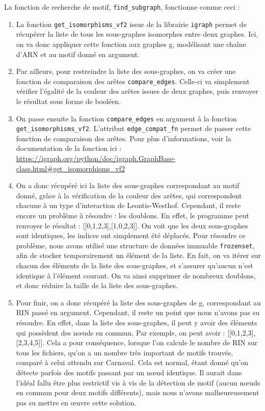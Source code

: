 \documentclass[11pt,a4paper]{article}
\begin{document}
La fonction de recherche de motif, \texttt{find\_subgraph}, fonctionne comme ceci : \\
\begin{enumerate}
\item La fonction \texttt{get\_isomorphisms\_vf2} issue de la librairie \texttt{igraph} permet de récupérer la liste de tous les sous-graphes isomorphes entre deux graphes. Ici, on va donc appliquer cette fonction aux graphes g, modélisant une chaîne d'ARN et au motif donné en argument. \\
\item Par ailleurs, pour restreindre la liste des sous-graphes, on va créer une fonction de comparaison des arêtes \texttt{compare\_edges}. Celle-ci va simplement vérifier l'égalité de la couleur des arêtes issues de deux graphes, puis renvoyer le résultat sous forme de booléen.  \\
\item On passe ensuite la fonction \texttt{compare\_edges} en argument à la fonction \texttt{get\_isomorphisms\_vf2}. L'attribut \texttt{edge\_compat\_fn} permet de passer cette fonction de comparaison des arêtes. Pour plus d'informations, voir la documentation de la fonction ici : 
\url{https://igraph.org/python/doc/igraph.GraphBase-class.html#get_isomorphisms_vf2} \\
\item On a donc récupéré ici la liste des sous-graphes correspondant au motif donné, grâce à la vérification de la couleur des arêtes, qui correspondent chacune à un type d'interaction de Leontis-Westhof.
Cependant, il reste encore un problème à résoudre : les doublons. En effet, le programme peut renvoyer le résultat : [[0,1,2,3],[1,0,2,3]].
On voit que les deux sous-graphes sont identiques, les indices ont simplement été déplacés. Pour résoudre ce problème, nous avons utilisé une structure de données immuable \texttt{frozenset}, afin de stocker temporairement un élément de la liste. En fait, on va itérer sur chacun des éléments de la liste des sous-graphes, et s'assurer qu'aucun n'est identique à l'élément courant. On va ainsi supprimer de nombreux doublons, et donc réduire la taille de la liste des sous-graphes. \\
\item Pour finir, on a donc récupéré la liste des sous-graphes de g, correspondant au RIN passé en argument. Cependant, il reste un point que nous n'avons pas su résoudre. En effet, dans la liste des sous-graphes, il peut y avoir des éléments qui possèdent des nœuds en commun. Par exemple, on peut avoir : [[0,1,2,3],[2,3,4,5]]. Cela a pour conséquence, lorsque l'on calcule le nombre de RIN sur tous les fichiers, qu'on a un nombre très important de motifs trouvés, comparé à celui attendu sur Carnaval. Cela est normal, étant donné qu'on détecte parfois des motifs passant par un nœud identique. Il aurait dans l'idéal fallu être plus restrictif vis à vis de la détection de motif (aucun nœuds en commun pour deux motifs différents), mais nous n'avons malheureusement pas su mettre en œuvre cette solution.

\end{enumerate}
\end{document}

